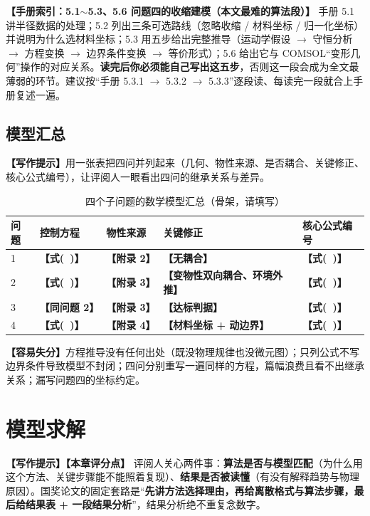 \documentclass[12pt,a4paper]{article}
\newcommand{\prompt}[1]{\par\noindent\textbf{【写作提示】}#1\par}      %
\newcommand{\pitfall}[1]{\par\noindent\textbf{【容易失分】}#1\par}     %
\newcommand{\ph}[1]{\textbf{【#1】}}                                   %
\newcommand{\handbook}[2]{\par\noindent\textbf{【手册索引：#1】} #2\par}
\begin{document}
\handbook{5.1$\sim$5.3、5.6 问题四的收缩建模（本文最难的算法段）}{手册 5.1 讲半径数据的处理；5.2 列出三条可选路线（忽略收缩 / 材料坐标 / 归一化坐标）并说明为什么选材料坐标；5.3 用五步给出完整推导（运动学假设 $\rightarrow$ 守恒分析 $\rightarrow$ 方程变换 $\rightarrow$ 边界条件变换 $\rightarrow$ 等价形式）；5.6 给出它与 COMSOL“变形几何”操作的对应关系。\textbf{读完后你必须能自己写出这五步}，否则这一段会成为全文最薄弱的环节。建议按“手册 5.3.1 $\to$ 5.3.2 $\to$ 5.3.3”逐段读、每读完一段就合上手册复述一遍。}

\subsection{模型汇总}

\prompt{用一张表把四问并列起来（几何、物性来源、是否耦合、关键修正、核心公式编号），让评阅人一眼看出四问的继承关系与差异。}

\begin{table}[H]
\centering
\caption{四个子问题的数学模型汇总（骨架，请填写）}
\label{tab:model-summary}
\begin{tabular}{p{1.5cm}p{3.3cm}p{2.8cm}p{3.3cm}p{3.4cm}}
\toprule
问题 & 控制方程 & 物性来源 & 关键修正 & 核心公式编号\\
\midrule
1 & \ph{式(\ )} & \ph{附录 2} & \ph{无耦合} & \ph{式(\ )}\\
2 & \ph{式(\ )} & \ph{附录 3} & \ph{变物性双向耦合、环境外推} & \ph{式(\ )}\\
3 & \ph{同问题 2} & \ph{附录 3} & \ph{达标判据} & \ph{式(\ )}\\
4 & \ph{式(\ )} & \ph{附录 4} & \ph{材料坐标 + 动边界} & \ph{式(\ )}\\
\bottomrule
\end{tabular}
\end{table}

\pitfall{方程推导没有任何出处（既没物理规律也没微元图）；只列公式不写边界条件导致模型不封闭；四问分别重写一遍同样的方程，篇幅浪费且看不出继承关系；漏写问题四的坐标约定。}

\clearpage

\section{模型求解}

\prompt{\textbf{【本章评分点】} 评阅人关心两件事：\textbf{算法是否与模型匹配}（为什么用这个方法、关键步骤能不能照着复现）、\textbf{结果是否被读懂}（有没有解释趋势与物理原因）。国奖论文的固定套路是“\textbf{先讲方法选择理由，再给离散格式与算法步骤，最后给结果表 + 一段结果分析}”，结果分析绝不重复念数字。}
\end{document}
